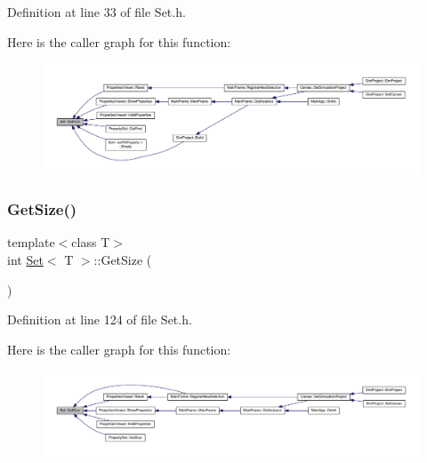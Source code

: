 Definition at line 33 of file Set.\+h.

Here is the caller graph for this function\+:
\nopagebreak
\begin{figure}[H]
\begin{center}
\leavevmode
\includegraphics[width=350pt]{class_set_ad9d6a75a557bc4db0578f18675f7517b_icgraph}
\end{center}
\end{figure}
\mbox{\label{class_set_a3638f81fb2a7b08e6f0e2ecd5543f85c}} 
\subsubsection{\texorpdfstring{Get\+Size()}{GetSize()}}
{\footnotesize\ttfamily template$<$class T$>$ \\
int \hyperlink{class_set}{Set}$<$ T $>$\+::Get\+Size (\begin{DoxyParamCaption}{ }\end{DoxyParamCaption})\hspace{0.3cm}{\ttfamily [inline]}}



Definition at line 124 of file Set.\+h.

Here is the caller graph for this function\+:
\nopagebreak
\begin{figure}[H]
\begin{center}
\leavevmode
\includegraphics[width=350pt]{class_set_a3638f81fb2a7b08e6f0e2ecd5543f85c_icgraph}
\end{center}
\end{figure}
\mbox{\label{class_set_a48747d0c4789b12fa690fa262e5bf361}} 
